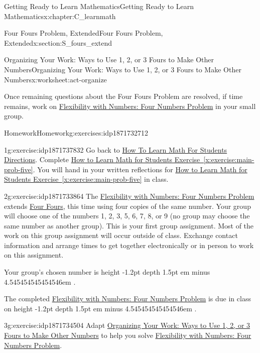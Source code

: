 \documentclass[oneside,10pt,]{book}
\newcommand{\xreffont}{\relax}
\newcommand{\fillin}[1]{\leavevmode\leaders\vrule height -1.2pt depth 1.5pt \hskip #1em minus #1em \null}
\numberwithin{equation}{chapter}
\begin{document}
\begin{chapterptx}{Getting Ready to Learn Mathematics}{}{Getting Ready to Learn Mathematics}{}{}{x:chapter:C_learnmath}
\begin{sectionptx}{Four Fours Problem, Extended}{}{Four Fours Problem, Extended}{}{}{x:section:S_fours_extend}
\begin{worksheet-subsection}{Organizing Your Work: Ways to Use 1, 2, or 3 Fours to Make Other Numbers}{}{Organizing Your Work: Ways to Use 1, 2, or 3 Fours to Make Other Numbers}{}{}{x:worksheet:act-organize}
\begin{conclusion}{}
\par
Once remaining questions about the Four Fours Problem are resolved, if time remains, work on \hyperref[x:worksheet:act-four-nums-prob]{Flexibility with Numbers: Four Numbers Problem} in your small group.%
\end{conclusion}%
\end{worksheet-subsection}
\restoregeometry
%
%
\typeout{************************************************}
\typeout{************************************************}
%
\begin{exercises-subsection}{Homework}{}{Homework}{}{}{g:exercises:idp1871732712}
\begin{divisionexercise}{1}{}{}{g:exercise:idp1871737832}%
Go back to \hyperlink{x:paragraphs:htlmfs-directions}{How To Learn Math For Students Directions}. Complete \hyperref[x:exercise:main-prob-five]{How to Learn Math for Students Exercise~{\xreffont\ref{x:exercise:main-prob-five}}}. You will hand in your written reflections for \hyperref[x:exercise:main-prob-five]{How to Learn Math for Students Exercise~{\xreffont\ref{x:exercise:main-prob-five}}} in class.%
\end{divisionexercise}%
\begin{divisionexercise}{2}{}{}{g:exercise:idp1871733864}%
The \hyperref[x:worksheet:act-four-nums-prob]{Flexibility with Numbers: Four Numbers Problem} extends \hyperref[x:worksheet:act-four-fours]{Four Fours}, this time using four copies of the same number. Your group will choose one of the numbers 1, 2, 3, 5, 6, 7, 8, or 9 (no group may choose the same number as another group). This is your first group assignment. Most of the work on this group assignment will occur outside of class. Exchange contact information and arrange times to get together electronically or in person to work on this assignment.%
\par
Your group's chosen number is \fillin{4.545454545454546}.%
\par
The completed \hyperref[x:worksheet:act-four-nums-prob]{Flexibility with Numbers: Four Numbers Problem} is due in class on \fillin{4.545454545454546}.%
\end{divisionexercise}%
\begin{divisionexercise}{3}{}{}{g:exercise:idp1871734504}%
Adapt \hyperref[x:worksheet:act-organize]{Organizing Your Work: Ways to Use 1, 2, or 3 Fours to Make Other Numbers} to help you solve \hyperref[x:worksheet:act-four-nums-prob]{Flexibility with Numbers: Four Numbers Problem}.%
\end{divisionexercise}%

\end{exercises-subsection}
\end{sectionptx}
\end{chapterptx}
\end{document}
